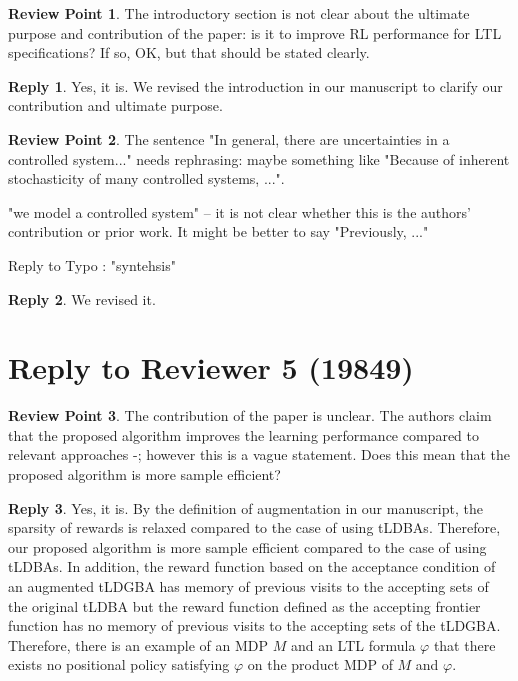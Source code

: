 \documentclass[10 pt, dvipdfmx]{article}
\theoremstyle{definition}
\newtheorem{review point}{Review Point}[section]
\newtheorem*{reply}{Reply}
\begin{document}
\begin{review point}
  The introductory section is not clear about the ultimate purpose and
contribution of the paper: is it to improve RL performance for LTL
specifications? If so, OK, but that should be stated clearly.
\end{review point}

\begin{reply}
  Yes, it is. We revised the introduction in our manuscript to clarify our contribution and ultimate purpose.
\end{reply}

\begin{review point}
  The sentence "In general, there are uncertainties in a controlled
system..." needs rephrasing: maybe something like "Because of inherent
stochasticity of many controlled systems, ...".

"we model a controlled system" -- it is not clear whether this is the
authors' contribution or prior work. It might be better to say
"Previously, ..."

Reply to Typo : "syntehsis"
\end{review point}

\begin{reply}
  We revised it.
\end{reply}

\section{Reply to Reviewer 5 (19849)}

\begin{review point}
  The contribution of the paper is unclear. The authors claim that the
proposed algorithm improves the learning performance compared to
relevant approaches \cite{Hahn2019}-\cite{BWZP2019}; however this is a vague statement. Does
this mean that the proposed algorithm is more sample efficient?
\end{review point}

\begin{reply}
  Yes, it is. By the definition of augmentation in our manuscript, the sparsity of rewards is relaxed compared to the case of using tLDBAs. Therefore, our proposed algorithm is more sample efficient compared to the case of using tLDBAs. In addition, the reward function based on the acceptance condition of an augmented tLDGBA has memory of previous visits to the accepting sets of the original tLDBA but the reward function defined as the accepting frontier function \cite{HAK2019} has no memory of previous visits to the accepting sets of the tLDGBA. Therefore, there is an example of an MDP $M$ and an LTL formula $\varphi$ that there exists no positional policy satisfying $\varphi$ on the product MDP of $M$ and $\varphi$.
\end{reply}
\end{document}
